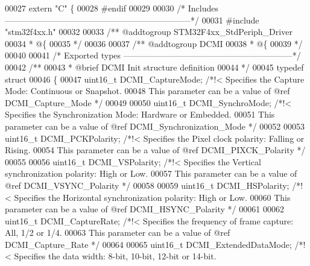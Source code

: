 \begin{DoxyCode}
00027  \textcolor{keyword}{extern} \textcolor{stringliteral}{"C"} \{
00028 \textcolor{preprocessor}{#}\textcolor{preprocessor}{endif}
00029 
00030 \textcolor{comment}{/* Includes ------------------------------------------------------------------*/}
00031 \textcolor{preprocessor}{#}\textcolor{preprocessor}{include} "stm32f4xx.h"
00032 
00033 \textcolor{comment}{/** @addtogroup STM32F4xx\_StdPeriph\_Driver}
00034 \textcolor{comment}{  * @\{}
00035 \textcolor{comment}{  */}
00036 
00037 \textcolor{comment}{/** @addtogroup DCMI}
00038 \textcolor{comment}{  * @\{}
00039 \textcolor{comment}{  */}
00040 
00041 \textcolor{comment}{/* Exported types ------------------------------------------------------------*/}
00042 \textcolor{comment}{/** }
00043 \textcolor{comment}{  * @brief   DCMI Init structure definition  }
00044 \textcolor{comment}{  */}
00045 \textcolor{keyword}{typedef} \textcolor{keyword}{struct}
00046 \{
00047   uint16\_t DCMI_CaptureMode;      \textcolor{comment}{/*!< Specifies the Capture Mode: Continuous or Snapshot.}
00048 \textcolor{comment}{                                       This parameter can be a value of @ref DCMI\_Capture\_Mode */}
00049 
00050   uint16\_t DCMI_SynchroMode;      \textcolor{comment}{/*!< Specifies the Synchronization Mode: Hardware or Embedded.}
00051 \textcolor{comment}{                                       This parameter can be a value of @ref DCMI\_Synchronization\_Mode
       */}
00052 
00053   uint16\_t DCMI_PCKPolarity;      \textcolor{comment}{/*!< Specifies the Pixel clock polarity: Falling or Rising.}
00054 \textcolor{comment}{                                       This parameter can be a value of @ref DCMI\_PIXCK\_Polarity */}
00055 
00056   uint16\_t DCMI_VSPolarity;       \textcolor{comment}{/*!< Specifies the Vertical synchronization polarity: High or Low.}
00057 \textcolor{comment}{                                       This parameter can be a value of @ref DCMI\_VSYNC\_Polarity */}
00058 
00059   uint16\_t DCMI_HSPolarity;       \textcolor{comment}{/*!< Specifies the Horizontal synchronization polarity: High or Low.}
00060 \textcolor{comment}{                                       This parameter can be a value of @ref DCMI\_HSYNC\_Polarity */}
00061 
00062   uint16\_t DCMI_CaptureRate;      \textcolor{comment}{/*!< Specifies the frequency of frame capture: All, 1/2 or 1/4.}
00063 \textcolor{comment}{                                       This parameter can be a value of @ref DCMI\_Capture\_Rate */}
00064 
00065   uint16\_t DCMI_ExtendedDataMode; \textcolor{comment}{/*!< Specifies the data width: 8-bit, 10-bit, 12-bit or 14-bit.}

\end{DoxyCode}
